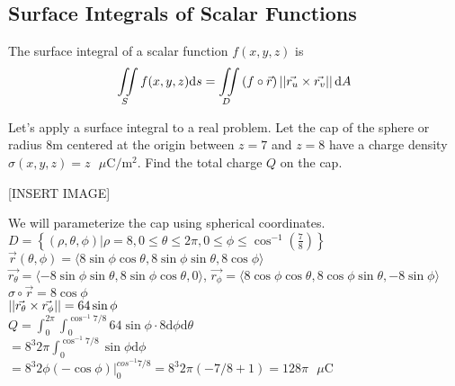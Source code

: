 \subsection{Surface Integrals of Scalar Functions}
\begin{definition}
	The surface integral of a scalar function $f(x,y,z)$ is\\
	$$\iint\limits_{S}{f(x,y,z)\mathrm{d}s}=\iint\limits_{D}{(f\circ\vec{r})\left|\left|\vec{r_u}\times\vec{r_v}\right|\right|\mathrm{d}A}$$
\end{definition}

\noindent
Let’s apply a surface integral to a real problem. Let the cap of the sphere or radius $8\text{m}$ centered at the origin between $z=7$ and $z=8$ have a charge density $\sigma(x,y,z)=z\text{ }\mu\text{C}/\text{m}^2$. Find the total charge $Q$ on the cap.

[INSERT IMAGE]

\indent
We will parameterize the cap using spherical coordinates.\\
\indent
$D=\left\{(\rho,\theta,\phi)|\rho=8,0\leq\theta\leq 2\pi, 0\leq\phi\leq\cos^{-1}{\left(\frac{7}{8}\right)}\right\}$\\
\indent
$\vec{r}(\theta,\phi)=\langle 8\sin{\phi}\cos{\theta}, 8\sin{\phi}\sin{\theta}, 8\cos{\phi}\rangle$\\
\indent
$\vec{r_\theta}=\langle -8\sin{\phi}\sin{\theta}, 8\sin{\phi}\cos{\theta}, 0\rangle$, $\vec{r_\phi}=\langle 8\cos{\phi}\cos{\theta}, 8\cos{\phi}\sin{\theta}, -8\sin{\phi}\rangle$\\
\indent
$\sigma\circ\vec{r}=8\cos{\phi}$\\
\indent
$\left|\left|\vec{r_\theta}\times\vec{r_\phi}\right|\right|=64\sin{\phi}$\\
\indent
$Q=\int_{0}^{2\pi}{\int_{0}^{\cos^{-1}{7/8}}{64\sin{\phi}\cdot8\mathrm{d}\phi\mathrm{d}\theta}}$\\
\indent
$=8^3 2\pi\int_{0}^{\cos^{-1}{7/8}}{\sin{\phi}\mathrm{d}\phi}$\\
\indent
$=8^3 2\phi(-\cos{\phi})\rvert_{0}^{cos^{-1}{7/8}}=8^3 2\pi\left(-7/8 + 1\right)=128\pi\text{ }\mu\text{C}$\\